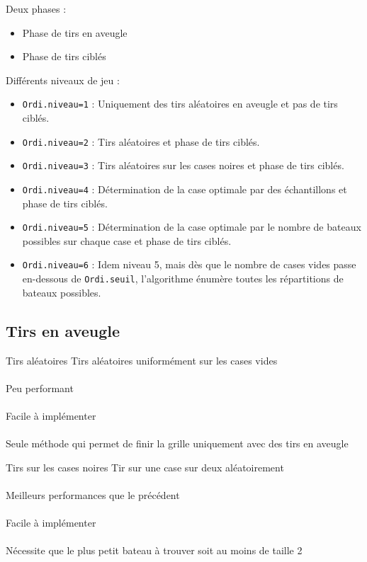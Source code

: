 \begin{frame}
Deux phases :\pause
\begin{itemize}
\item Phase de tirs en aveugle\pause
\item Phase de tirs ciblés
\end{itemize}
\end{frame}

\begin{frame}
Différents niveaux de jeu :
\begin{itemize}
\item<1> \texttt{Ordi.niveau=1} : Uniquement des tirs aléatoires en aveugle et pas de tirs ciblés.
\item<2> \texttt{Ordi.niveau=2} : Tirs aléatoires et phase de tirs ciblés.
\item<3> \texttt{Ordi.niveau=3} : Tirs aléatoires sur les cases noires  et phase de tirs ciblés.
\item<4> \texttt{Ordi.niveau=4} : Détermination de la case optimale par des échantillons et phase de tirs ciblés.
\item<5> \texttt{Ordi.niveau=5} : Détermination de la case optimale par le nombre de bateaux possibles sur chaque case et phase de tirs ciblés.
\item<6> \texttt{Ordi.niveau=6} : Idem niveau 5, mais dès que le nombre de cases vides passe en-dessous de \texttt{Ordi.seuil}, l'algorithme énumère toutes les répartitions de bateaux possibles.
\end{itemize}
\end{frame}

\subsection{Tirs en aveugle}
\begin{frame}{Tirs aléatoires}
Tirs aléatoires uniformément sur les cases vides\\~\\  \pause
Peu performant\\~\\ \pause
Facile à implémenter\\~\\ \pause
Seule méthode qui permet de finir la grille uniquement avec des tirs en aveugle
\end{frame}


\begin{frame}{Tirs sur les cases noires}
Tir sur une case sur deux aléatoirement\\~\\ \pause
Meilleurs performances que le précédent\\~\\ \pause
Facile à implémenter\\~\\ \pause
Nécessite que le plus petit bateau à trouver soit au moins de taille 2
\end{frame}

